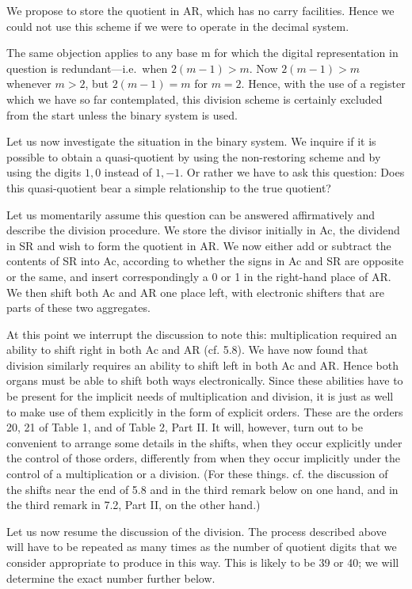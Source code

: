 \documentclass[12pt]{amsart}
\begin{document}
We propose to store the quotient in AR, which has no carry facilities. Hence we could not use this scheme if we were to operate in the decimal system.

The same objection applies to any base m for which the digital representation in question is redundant---i.e.\ when $2(m - 1) > m$. Now $2(m - 1) > m$ whenever $m > 2$, but $2(m - 1) = m$ for $m = 2$. Hence, with the use of a register which we have so far contemplated, this division scheme is certainly excluded from the start unless the binary system is used.

Let us now investigate the situation in the binary system. We inquire if it is possible to obtain a quasi-quotient by using the non-restoring scheme and by using the digits $1, 0$ instead of $1, -1$. Or rather we have to ask this question: Does this quasi-quotient bear a simple relationship to the true quotient?

Let us momentarily assume this question can be answered affirmatively and describe the division procedure. We store the divisor initially in Ac, the dividend in SR and wish to form the quotient in AR. We now either add or subtract the contents of SR into Ac, according to whether the signs in Ac and SR are opposite or the same, and insert correspondingly a 0 or 1 in the right-hand place of AR. We then shift both Ac and AR one place left, with electronic shifters that are parts of these two aggregates.

At this point we interrupt the discussion to note this: multiplication required an ability to shift right in both Ac and AR (cf. 5.8). We have now found that division similarly requires an ability to shift left in both Ac and AR. Hence both organs must be able to shift both ways electronically. Since these abilities have to be present for the implicit needs of multiplication and division, it is just as well to make use of them explicitly in the form of explicit orders. These are the orders 20, 21 of Table 1, and of Table 2, Part II. It will, however, turn out to be convenient to arrange some details in the shifts, when they occur explicitly under the control of those orders, differently from when they occur implicitly under the control of a multiplication or a division. (For these things. cf. the discussion of the shifts near the end of 5.8 and in the third remark below on one hand, and in the third remark in 7.2, Part II, on the other hand.)

Let us now resume the discussion of the division. The process described above will have to be repeated as many times as the number of quotient digits that we consider appropriate to produce in this way. This is likely to be 39 or 40; we will determine the exact number further below.
\end{document}
